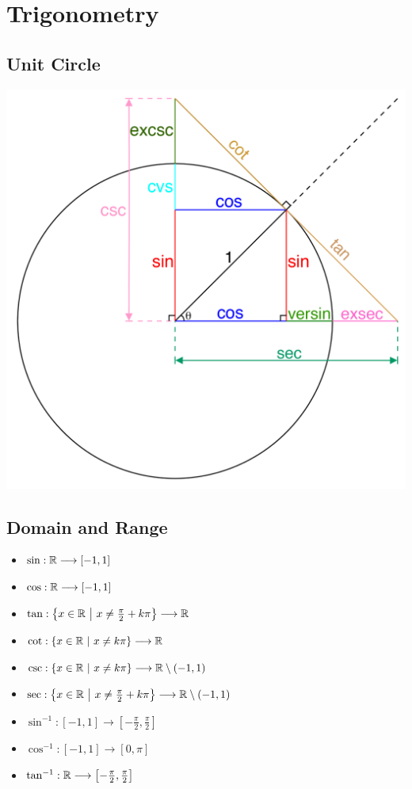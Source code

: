 \section*{Trigonometry}

\subsection*{Unit Circle}
\begin{Figure}
	\centering
	\includegraphics[width=\linewidth]{circle}
\end{Figure}
\subsection*{Domain and Range}
\begin{itemize}[leftmargin=0.5em, label={.}]
  \item $\sin: \mathbb{R} \longrightarrow[-1,1]$
  \item $\cos: \mathbb{R} \longrightarrow[-1,1]$
  \item $\tan: \left\{x \in \mathbb{R} \ \middle| \ x \neq \frac{\pi}{2} + k\pi\right\}\longrightarrow\mathbb{R}$
  \item $\cot: \left\{x \in \mathbb{R} \ \middle| \ x \neq k\pi\right\}\longrightarrow\mathbb{R}$
  \item $\csc: \left\{x \in \mathbb{R} \ \middle| \ x \neq k\pi\right\}\longrightarrow \mathbb{R} \setminus \left(-1,1 \right)$
  \item $\sec:\left\{x \in \mathbb{R} \ \middle| \ x \neq \frac{\pi}{2} + k\pi\right\}\longrightarrow \mathbb{R} \setminus \left(-1,1\right)$
  \item $\sin^{-1}: \left[-1,1\right] \longrightarrow \left[-\frac{\pi}{2},\frac{\pi}{2}\right]$
  \item $\cos^{-1}: \left[-1,1\right] \longrightarrow \left[0,\pi\right]$		
  \item $\tan^{-1}: \mathbb{R} \longrightarrow \left[-\frac{\pi}{2},\frac{\pi}{2}\right]$
\end{itemize}

